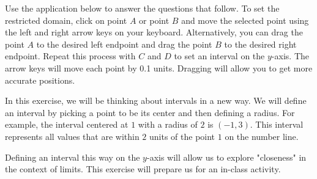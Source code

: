 \documentclass{ximera}
\author{Kevin James}
\begin{document}
   \begin{exercise}
   	Use the application below to answer the questions that follow.  To set the restricted domain, click on point $ A $ or point $ B $ and move the selected point using the left and right arrow keys on your keyboard.  Alternatively, you can drag the point $ A $ to the desired left endpoint and drag the point $ B $ to the desired right endpoint.  Repeat this process with $ C $ and $ D $ to set an interval on the $y$-axis.  The arrow keys will move each point by 0.1 units.  Dragging will allow you to get more accurate positions.  
    
    \begin{center}
    	\begin{onlineOnly}
    	\end{onlineOnly} 
    \end{center}
    
    In this exercise, we will be thinking about intervals in a new way.  We will define an interval by picking a point to be its center and then defining a radius.  For example, the interval centered at $1$ with a radius of $2$ is $(-1, 3)$.  This interval represents all values that are within $2$ units of the point $1$ on the number line.
    
    Defining an interval this way on the $y$-axis will allow us to explore "closeness" in the context of limits.  This exercise will prepare us for an in-class activity.
    

\end{exercise}
\end{document}
